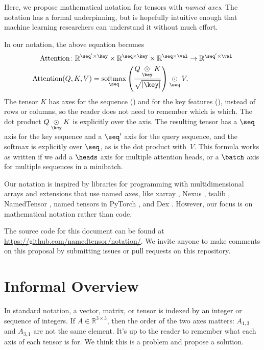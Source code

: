 \documentclass{article}
\newcommand{\reals}{\mathbb{R}}
\begin{document}
Here, we propose mathematical notation for tensors with \emph{named axes}. The notation has a formal underpinning, but is hopefully intuitive enough that machine learning researchers can understand it without much effort.

In our notation, the above equation becomes
\begin{align*}
  \text{Attention} \colon \mathbb{R}^{\seq' \times \key} \times \mathbb{R}^{\seq \times \key} \times \mathbb{R}^{\seq \times\val} &\rightarrow \mathbb{R}^{\seq' \times \val} \\
  \text{Attention}(Q,K,V) = \nfun{\seq}{softmax} \left( \frac{Q \ndot{\key} K}{\sqrt{|\key|}} \right) \ndot{\seq} V.
\end{align*}
The tensor $K$ has axes for the sequence (\seq) and for the key features (\key), instead of rows or columns, so the reader does not need to remember which is which. The dot product $Q \ndot{\key} K$ is explicitly over the \key axis. The resulting tensor has a $\seq$ axis for the key sequence and a $\seq'$ axis for the query sequence, and the softmax is explicitly over $\seq$, as is the dot product with~$V$.
This formula works as written if we add a $\heads$ axis for multiple attention heads, or a $\batch$ axis for multiple sequences in a minibatch.

Our notation is inspired by libraries for programming with multidimensional arrays \citep{numpy,pytorch} and extensions that use named axes, like xarray \citep{xarray}, Nexus \citep{chen2017typesafe}, tsalib \citep{tsalib}, NamedTensor \citep{namedtensor}, named tensors in PyTorch \citep{named-tensors}, and Dex \citep{maclaurin+:2019}. However, our focus is on mathematical notation rather than code.

The source code for this document can be found at \url{https://github.com/namedtensor/notation/}. We invite anyone to make comments on this proposal by submitting issues or pull requests on this repository.

\section{Informal Overview}
\label{sec:overview}

In standard notation, a vector, matrix, or tensor is indexed by an integer or sequence of integers. If $A \in \reals^{3\times3}$, then the order of the two axes matters: $A_{1,3}$ and $A_{3,1}$ are not the same element. It's up to the reader to remember what each axis of each tensor is for. We think this is a problem and propose a solution.
\end{document}
